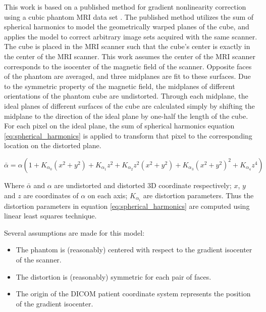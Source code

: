 This work is based on a published method for gradient nonlinearity correction using a cubic phantom MRI data set \cite{tom}. The published method utilizes the sum of spherical
harmonics to model the geometrically warped planes of the cube, and applies the model
to correct arbitrary image sets acquired with the same scanner. The cube is
placed in the MRI scanner such that the cube's center is exactly in the center of the MRI scanner.  This work assumes the center of the MRI scanner corresponds to the isocenter of the
magnetic field of the scanner. Opposite faces of the phantom are averaged, and three midplanes are fit to these surfaces.  Due to the symmetric property of the magnetic field,
the midplanes of different orientations of the phantom cube are undistorted.  Through each midplane, the ideal planes of different surfaces
of the cube are calculated simply by shifting the midplane to the direction
of the ideal plane by one-half the length of the cube. For each pixel on
the ideal plane, the sum of spherical
harmonics equation \ref{eq:spherical_harmonics} is applied to transform that pixel to the corresponding location on the distorted plane.

\begin{equation} \label{eq:spherical_harmonics}
\bar{\alpha} = \alpha(1 + K_{\alpha_0}(x^2 + y^2) + K_{\alpha_1}z^2 +
K_{\alpha_2}z^2(x^2 + y^2) + K_{\alpha_3}(x^2 + y^2)^2 +
K_{\alpha_4}z^4)
\end{equation}

Where $\bar{\alpha}$ and $\alpha$ are undistorted and distorted 3D coordinate respectively; $x$, $y$ and $z$ are coordinates of $\alpha$ on each axis; $K_{\alpha_i}$ are distortion parameters. Thus the distortion parameters in
equation \ref{eq:spherical_harmonics} are computed using linear least squares
technique.

Several assumptions are made for this model:
\begin{itemize}
  \item The phantom is (reasonably) centered with respect to the gradient isocenter of the scanner.
  \item The distortion is (reasonably) symmetric for each pair of faces.
  \item The origin of the DICOM patient coordinate system represents the position of the gradient isocenter.
\end{itemize}

